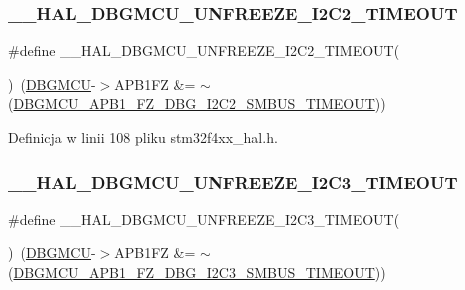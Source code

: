 \subsubsection{\texorpdfstring{\+\_\+\+\_\+\+H\+A\+L\+\_\+\+D\+B\+G\+M\+C\+U\+\_\+\+U\+N\+F\+R\+E\+E\+Z\+E\+\_\+\+I2\+C2\+\_\+\+T\+I\+M\+E\+O\+UT}{\_\_HAL\_DBGMCU\_UNFREEZE\_I2C2\_TIMEOUT}}
{\footnotesize\ttfamily \#define \+\_\+\+\_\+\+H\+A\+L\+\_\+\+D\+B\+G\+M\+C\+U\+\_\+\+U\+N\+F\+R\+E\+E\+Z\+E\+\_\+\+I2\+C2\+\_\+\+T\+I\+M\+E\+O\+UT(\begin{DoxyParamCaption}{ }\end{DoxyParamCaption})~(\hyperlink{group___peripheral__declaration_ga92ec6d9ec2251fda7d4ce09748cd74b4}{D\+B\+G\+M\+CU}-\/$>$A\+P\+B1\+FZ \&= $\sim$(\hyperlink{group___peripheral___registers___bits___definition_ga8f6320aba695f6c3f97608e478533e96}{D\+B\+G\+M\+C\+U\+\_\+\+A\+P\+B1\+\_\+\+F\+Z\+\_\+\+D\+B\+G\+\_\+\+I2\+C2\+\_\+\+S\+M\+B\+U\+S\+\_\+\+T\+I\+M\+E\+O\+UT}))}



Definicja w linii 108 pliku stm32f4xx\+\_\+hal.\+h.

\mbox{\label{group___h_a_l___exported___macros_ga8beda05b7dc4962557f98a06e29326a4}} 
\subsubsection{\texorpdfstring{\+\_\+\+\_\+\+H\+A\+L\+\_\+\+D\+B\+G\+M\+C\+U\+\_\+\+U\+N\+F\+R\+E\+E\+Z\+E\+\_\+\+I2\+C3\+\_\+\+T\+I\+M\+E\+O\+UT}{\_\_HAL\_DBGMCU\_UNFREEZE\_I2C3\_TIMEOUT}}
{\footnotesize\ttfamily \#define \+\_\+\+\_\+\+H\+A\+L\+\_\+\+D\+B\+G\+M\+C\+U\+\_\+\+U\+N\+F\+R\+E\+E\+Z\+E\+\_\+\+I2\+C3\+\_\+\+T\+I\+M\+E\+O\+UT(\begin{DoxyParamCaption}{ }\end{DoxyParamCaption})~(\hyperlink{group___peripheral__declaration_ga92ec6d9ec2251fda7d4ce09748cd74b4}{D\+B\+G\+M\+CU}-\/$>$A\+P\+B1\+FZ \&= $\sim$(\hyperlink{group___peripheral___registers___bits___definition_ga7f7e5c708387aa1ddae35b892811b4e9}{D\+B\+G\+M\+C\+U\+\_\+\+A\+P\+B1\+\_\+\+F\+Z\+\_\+\+D\+B\+G\+\_\+\+I2\+C3\+\_\+\+S\+M\+B\+U\+S\+\_\+\+T\+I\+M\+E\+O\+UT}))}



